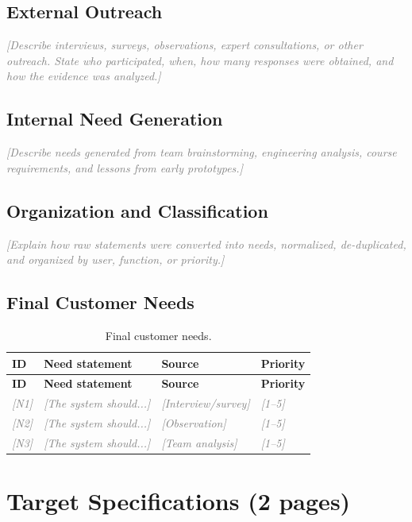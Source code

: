 \documentclass[11pt,letterpaper]{article}
\newcommand{\placeholder}[1]{\textcolor{gray}{\textit{[#1]}}}
\begin{document}
\subsection{External Outreach}
\placeholder{Describe interviews, surveys, observations, expert consultations,
or other outreach. State who participated, when, how many responses were
obtained, and how the evidence was analyzed.}

\subsection{Internal Need Generation}
\placeholder{Describe needs generated from team brainstorming, engineering
analysis, course requirements, and lessons from early prototypes.}

\subsection{Organization and Classification}
\placeholder{Explain how raw statements were converted into needs, normalized,
de-duplicated, and organized by user, function, or priority.}

\subsection{Final Customer Needs}
\begin{longtable}{p{}p{}p{}p{}}
\caption{Final customer needs.}\label{tab:customer-needs}\\
\toprule
\textbf{ID} & \textbf{Need statement} & \textbf{Source} & \textbf{Priority}\\
\midrule
\endfirsthead
\toprule
\textbf{ID} & \textbf{Need statement} & \textbf{Source} & \textbf{Priority}\\
\midrule
\endhead
\placeholder{N1} & \placeholder{The system should...} & \placeholder{Interview/survey} &
\placeholder{1--5} \\
\placeholder{N2} & \placeholder{The system should...} & \placeholder{Observation} &
\placeholder{1--5} \\
\placeholder{N3} & \placeholder{The system should...} & \placeholder{Team analysis} &
\placeholder{1--5} \\
\bottomrule
\end{longtable}

\section{Target Specifications (2 pages)}
\end{document}
